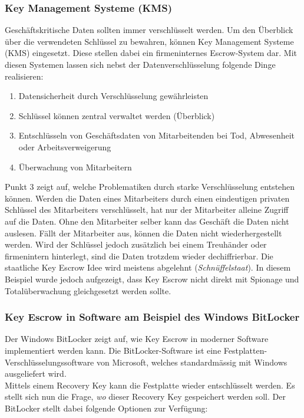 	\subsubsection{Key Management Systeme (KMS)}	
Geschäftskritische Daten sollten immer verschlüsselt werden. Um den Überblick über die verwendeten Schlüssel zu bewahren, können Key Management Systeme (KMS) eingesetzt. Diese stellen dabei ein firmeninternes Escrow-System dar.
Mit diesen Systemen lassen sich nebst der Datenverschlüsselung folgende Dinge realisieren:
\begin{enumerate}
	\item Datensicherheit durch Verschlüsselung gewährleisten
	\item Schlüssel können zentral verwaltet werden (Überblick)
	\item Entschlüsseln von Geschäftsdaten von Mitarbeitenden bei Tod, Abwesenheit oder Arbeitsverweigerung
  	\item Überwachung von Mitarbeitern
\end{enumerate}
Punkt 3 zeigt auf, welche Problematiken durch starke Verschlüsselung entstehen können. Werden die Daten eines Mitarbeiters durch einen eindeutigen privaten Schlüssel des Mitarbeiters verschlüsselt, hat nur der Mitarbeiter alleine Zugriff auf die Daten. Ohne den Mitarbeiter selber kann das Geschäft die Daten nicht auslesen. Fällt der Mitarbeiter aus, können die Daten nicht wiederhergestellt werden. Wird der Schlüssel jedoch zusätzlich bei einem Treuhänder oder firmenintern hinterlegt, sind die Daten trotzdem wieder dechiffrierbar.
Die staatliche Key Escrow Idee wird meistens abgelehnt (\textit{Schnüffelstaat}). In diesem Beispiel wurde jedoch aufgezeigt, dass Key Escrow nicht direkt mit Spionage und Totalüberwachung gleichgesetzt werden sollte.

	\subsubsection{Key Escrow in Software am Beispiel des Windows BitLocker}
Der Windows BitLocker zeigt auf, wie Key Escrow in moderner Software implementiert werden kann. Die BitLocker-Software ist eine Festplatten-Verschlüsselungssoftware von Microsoft, welches standardmässig mit Windows ausgeliefert wird. \\
Mittels einem Recovery Key kann die Festplatte wieder entschlüsselt werden. Es stellt sich nun die Frage, \textit{wo} dieser Recovery Key gespeichert werden soll. Der BitLocker stellt dabei folgende Optionen zur Verfügung:

